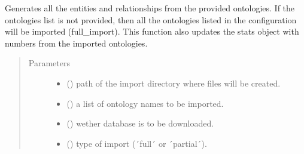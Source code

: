 \documentclass[letterpaper,10pt,english]{sphinxmanual}
\begin{document}
\begin{fulllineitems}
\label{\detokenize{_autosummary/graphdb_builder.builder:graphdb_builder.builder.importer.ontologiesImport}}
Generates all the entities and relationships from the provided ontologies. If the ontologies list is    not provided, then all the ontologies listed in the configuration will be imported (full\_import).     This function also updates the stats object with numbers from the imported ontologies.
\begin{quote}\begin{description}
\item[{Parameters}] \leavevmode\begin{itemize}
\item {} 
 () \textendash{} path of the import directory where files will be created.

\item {} 
 () \textendash{} a list of ontology names to be imported.

\item {} 
 () \textendash{} wether database is to be downloaded.

\item {} 
 () \textendash{} type of import (´full´ or ´partial´).

\end{itemize}

\end{description}\end{quote}

\end{fulllineitems}
\end{document}

